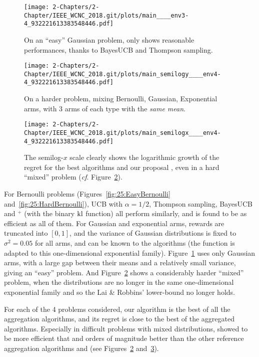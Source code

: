\begin{figure}[h!]  %
	\centering
	\texttt{[image: 2-Chapters/2-Chapter/IEEE\_WCNC\_2018.git/plots/main\_\_\_\_env3-4\_932221613383548446.pdf]}
	\caption{On an ``easy'' Gaussian problem, only \Aggr{} shows reasonable performances, thanks to BayesUCB and Thompson sampling.}
	\label{fig:25:EasyGaussian}
\end{figure}

\begin{figure}[h!]  %
	\centering
	\texttt{[image: 2-Chapters/2-Chapter/IEEE\_WCNC\_2018.git/plots/main\_semilogy\_\_\_\_env4-4\_932221613383548446.pdf]}
	\caption{On a harder problem, mixing Bernoulli, Gaussian, Exponential arms, with 3 arms of each type with the \emph{same mean}.}
	\label{fig:25:HarderMixed}
\end{figure}

\begin{figure}[h!]  %
	\centering
	\texttt{[image: 2-Chapters/2-Chapter/IEEE\_WCNC\_2018.git/plots/main\_semilogx\_\_\_\_env4-4\_932221613383548446.pdf]}
	\caption{The semilog-$x$ scale clearly shows the logarithmic growth of the regret for the best algorithms and our proposal \Aggr, even in a hard ``mixed'' problem (\emph{cf}. Figure~\ref{fig:25:HarderMixed}).}
	\label{fig:25:HarderMixed_semilogx}
\end{figure}

For Bernoulli problems (Figures~\ref{fig:25:EasyBernoulli} and~\ref{fig:25:HardBernoulli}), UCB with $\alpha=1/2$, Thompson sampling, BayesUCB and \klUCB{}$^+$ (with the binary $\mathrm{kl}$ function) all perform similarly, and \Aggr{} is found to be as efficient as all of them.
For Gaussian and exponential arms, rewards are truncated into $[0,1]$, and the variance of Gaussian distributions is fixed to $\sigma^2 = 0.05$ for all arms, and can be known to the algorithms (the \kl{} function is adapted to this one-dimensional exponential family).
%
Figure~\ref{fig:25:EasyGaussian} uses only Gaussian arms, with a large gap between their means and a relatively small variance, giving an ``easy'' problem.
%
And Figure~\ref{fig:25:HarderMixed} shows a considerably harder ``mixed'' problem, when the distributions are no longer in the same one-dimensional exponential family and so the Lai \& Robbins' lower-bound no longer holds.

For each of the 4 problems considered, our \Aggr{} algorithm  is the best of all the aggregation algorithms,
and its regret is close to the best of the aggregated algorithms.
Especially in difficult problems with mixed distributions, \Aggr{} showed to be more efficient that \ExpQ{} and orders of magnitude better than the other reference aggregation algorithms \LearnExp{} and \CORRAL{} (see Figures~\ref{fig:25:HarderMixed} and~\ref{fig:25:HarderMixed_semilogx}).


